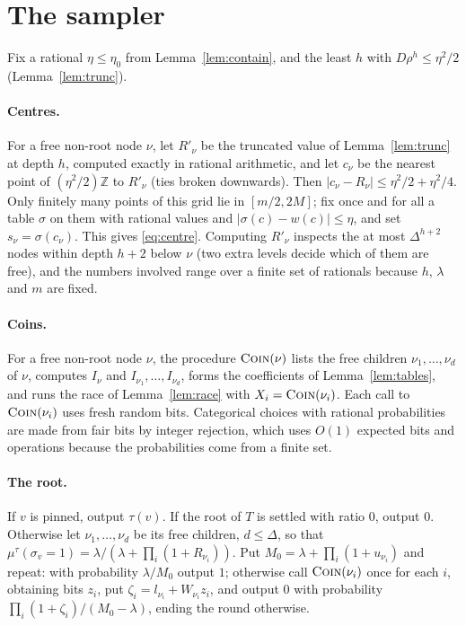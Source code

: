 \documentclass[11pt]{amsart}
\newcommand{\nsc}[1]{\textnormal{\textsc{#1}}}
\begin{document}
\section{The sampler}\label{sec:sampler}

Fix a rational $\eta\le\eta_0$ from Lemma~\ref{lem:contain}, and the least $h$ with $D\rho^h\le\eta^2/2$ (Lemma~\ref{lem:trunc}).

\paragraph{Centres.} For a free non-root node $\nu$, let $R'_\nu$ be the truncated value of Lemma~\ref{lem:trunc} at depth $h$, computed exactly in rational arithmetic, and let $c_\nu$ be the nearest point of $(\eta^2/2)\mathbb Z$ to $R'_\nu$ (ties broken downwards). Then $|c_\nu-R_\nu|\le\eta^2/2+\eta^2/4$. Only finitely many points of this grid lie in $[m/2,2M]$; fix once and for all a table $\sigma$ on them with rational values and $|\sigma(c)-w(c)|\le\eta$, and set $s_\nu=\sigma(c_\nu)$. This gives \eqref{eq:centre}. Computing $R'_\nu$ inspects the at most $\Delta^{h+2}$ nodes within depth $h+2$ below $\nu$ (two extra levels decide which of them are free), and the numbers involved range over a finite set of rationals because $h$, $\lambda$ and $m$ are fixed.

\paragraph{Coins.} For a free non-root node $\nu$, the procedure $\nsc{Coin}(\nu)$ lists the free children $\nu_1,\dots,\nu_d$ of $\nu$, computes $I_\nu$ and $I_{\nu_1},\dots,I_{\nu_d}$, forms the coefficients of Lemma~\ref{lem:tables}, and runs the race of Lemma~\ref{lem:race} with $X_i=\nsc{Coin}(\nu_i)$. Each call to $\nsc{Coin}(\nu_i)$ uses fresh random bits. Categorical choices with rational probabilities are made from fair bits by integer rejection, which uses $O(1)$ expected bits and operations because the probabilities come from a finite set.

\paragraph{The root.} If $v$ is pinned, output $\tau(v)$. If the root of $T$ is settled with ratio $0$, output $0$. Otherwise let $\nu_1,\dots,\nu_d$ be its free children, $d\le\Delta$, so that $\mu^\tau(\sigma_v=1)=\lambda/(\lambda+\prod_i(1+R_{\nu_i}))$. Put $M_0=\lambda+\prod_i(1+u_{\nu_i})$ and repeat: with probability $\lambda/M_0$ output $1$; otherwise call $\nsc{Coin}(\nu_i)$ once for each $i$, obtaining bits $z_i$, put $\zeta_i=l_{\nu_i}+W_{\nu_i}z_i$, and output $0$ with probability $\prod_i(1+\zeta_i)/(M_0-\lambda)$, ending the round otherwise.
\end{document}
